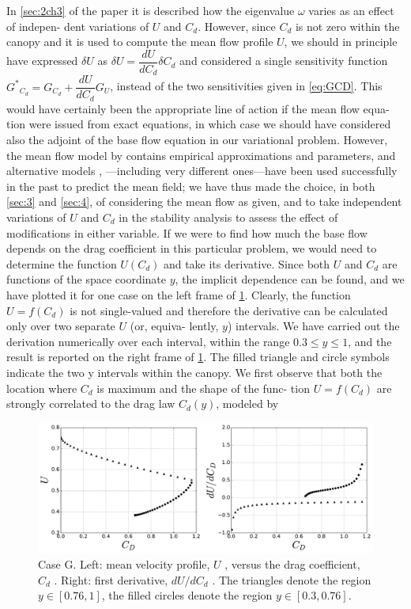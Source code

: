 In \ref{sec:2ch3} of the paper it is described how the eigenvalue $\omega$ varies as an effect of indepen-
dent variations of $U$ and $C_d$. However, since $C_d$ is not zero within the canopy and it is used to
compute the mean flow profile $U$, we should in principle have expressed $\delta U$ as $\delta U = \dfrac{dU}{d C_d} \delta C_d$
and considered a single sensitivity function ${G^*}_{C_d} = G_{C_d} + \dfrac{dU}{d C_d} G_U$, instead of the two sensitivities given
in \ref{eq:GCD}. This would have certainly been the appropriate line of action if the mean flow equa-
tion were issued from exact equations, in which case we should have considered also the adjoint
of the base flow equation in our variational problem. However, the mean flow model by \cite{ghisalberti2004limited} contains empirical approximations and parameters, and alternative models \cite{singh2016linear}, \cite{zampogna2016instability} —including
very different ones—have been used successfully in the past to predict the mean field; we have thus
made the choice, in both \ref{sec:3} and \ref{sec:4}, of considering the mean flow as given, and to take
independent variations of $U$ and $C_d$ in the stability analysis to assess the effect of modifications in
either variable.
If we were to find how much the base flow depends on the drag coefficient in this particular
problem, we would need to determine the function $U(C_d)$ and take its derivative. Since both $U$
and  $C_d$ are functions of the space coordinate $y$, the implicit dependence can be found, and we
have plotted it for one case on the left frame of \ref{fig:9}. Clearly, the function $U = f(C_d)$ is not
single-valued and therefore the derivative can be calculated only over two separate $U$ (or, equiva-
lently, $y$) intervals. We have carried out the derivation numerically over each interval, within the
range $0.3 \leq y \leq 1$, and the result is reported on the right frame of \ref{fig:9}. The filled triangle and
circle symbols indicate the two y intervals within the canopy.
We first observe that both the location where $C_d$ is maximum and the shape of the func-
tion $U = f(C_d)$ are strongly correlated to the drag law $C_d(y)$, modeled by \cite{ghisalberti2004limited}


\begin{figure}[H]
	\centering
	\includegraphics[width=1\linewidth]{chapter_3/figure/9}
	\caption{Case G. Left: mean velocity profile, $U$ , versus the drag coefficient, $C_d$ . Right: first derivative, $dU / d C_d$ . The triangles denote the region $y \in [0.76, 1]$, the filled circles denote the region $y \in [0.3, 0.76]$.}
	\label{fig:9}
\end{figure}

